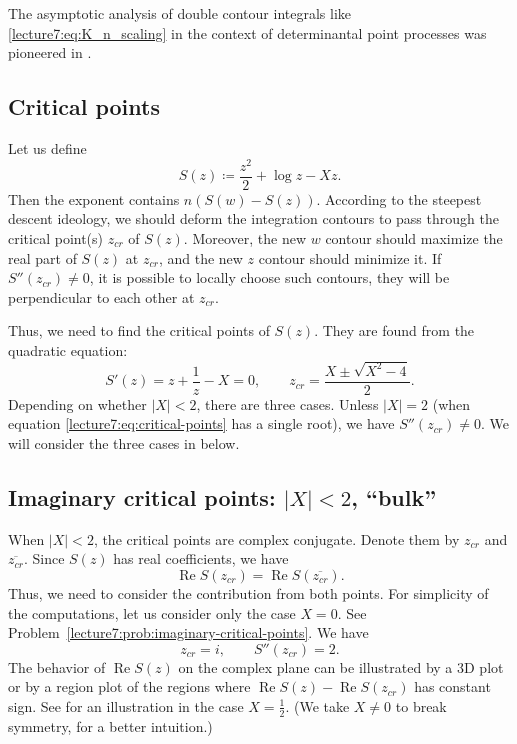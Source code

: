 \documentclass[letterpaper,11pt,oneside,reqno]{book}
\numberwithin{equation}{chapter}  %
\theoremstyle{definition}
\begin{document}
The asymptotic analysis of double contour integrals like
\eqref{lecture7:eq:K_n_scaling} in the context of determinantal point processes
was pioneered in \cite[Section~3]{Okounkov2002}.

\subsection{Critical points}
\label{lecture7:sub:critical-points}

Let us define
\begin{equation*}
	S(z)\coloneqq
	\frac{z^2}{2}+\log z -X z.
\end{equation*}
Then the exponent contains $n \left( S(w)-S(z) \right)$.
According to the steepest descent ideology, we
should deform the integration contours
to pass through the critical point(s) $z_{cr}$ of $S(z)$.
Moreover, the new $w$ contour should maximize the real part of $S(z)$
at $z_{cr}$, and the new $z$ contour should minimize it.
If $S''(z_{cr})\ne 0$, it is possible to locally choose such contours,
they will be perpendicular to each other at $z_{cr}$.

Thus, we need to find the critical points of $S(z)$.
They are found from the quadratic equation:
\begin{equation}
	\label{lecture7:eq:critical-points}
	S'(z)=z+\frac{1}{z}-X=0,\qquad
	z_{cr}=\frac{X\pm \sqrt{X^2-4}}{2}.
\end{equation}
Depending on whether $|X|<2$, there are three cases.
Unless $|X|=2$ (when equation \eqref{lecture7:eq:critical-points} has a single root), we have
$S''(z_{cr})\ne 0$.
We will consider the three cases in
below.

\subsection{Imaginary critical points: $|X|<2$, ``bulk''}
\label{lecture7:sub:imaginary-critical-points}

When $|X|<2$, the critical points are complex conjugate.
Denote them by $z_{cr}$ and $\overline{z_{cr}}$.
Since $S(z)$ has real coefficients, we have
\begin{equation*}
	\operatorname{Re}S(z_{cr})=\operatorname{Re}S(\overline{z_{cr}}).
\end{equation*}
Thus, we need to consider the contribution from both points.
For simplicity of the computations, let us consider only the case $X=0$.
See Problem~\ref{lecture7:prob:imaginary-critical-points}.
We have
\begin{equation*}
	z_{cr}=i,\qquad
	S''(z_{cr})=2.
\end{equation*}
The behavior of $\operatorname{Re}S(z)$ on the complex plane
can be illustrated by a 3D plot or by a region plot of the regions
where $\operatorname{Re}S(z)-\operatorname{Re}S(z_{cr})$ has constant sign.
See  for an illustration in the case $X=\frac{1}{2}$.
(We take $X\ne 0$ to break symmetry, for a better intuition.)
\end{document}
